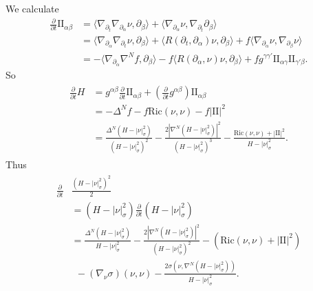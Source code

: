 \documentclass[11pt, letterpaper]{amsart}
\theoremstyle{definition}
\theoremstyle{remark}
\begin{document}
\begin{appendix}
We calculate
\begin{align*}
		\frac{\partial }{\partial t} \mathrm{II}_{\alpha \beta }&= \langle \nabla _{\partial _t} \nabla _{\partial _\alpha }\nu , \partial _{\beta } \rangle + \langle \nabla _{\partial _\alpha }\nu , \nabla _{\partial _t} \partial _{\beta } \rangle \\
							 &= \langle \nabla _{\partial _\alpha } \nabla _{\partial _t} \nu , \partial _{\beta } \rangle+ \langle  R(\partial _t, \partial _{\alpha }) \nu, \partial _{\beta } \rangle + f \langle \nabla _{\partial _\alpha }\nu , \nabla _{\partial _\beta }\nu  \rangle\\
							 &= - \langle \nabla _{\partial _\alpha } \nabla ^{N} f, \partial _{\beta } \rangle - f \langle R( \partial _{\alpha }, \nu )\nu , \partial _{\beta } \rangle+ f g ^{\gamma \gamma '} \mathrm{II}_{\alpha \gamma } \mathrm{II}_{\gamma ' \beta }.
	\end{align*} 
	So
	\begin{align}
		\begin{split}
			\frac{\partial }{\partial t} H &= g^{\alpha \beta } \frac{\partial }{\partial t} \mathrm{II}_{\alpha \beta } + (\frac{\partial }{\partial t} g^{\alpha \beta } )\mathrm{II}_{\alpha \beta } \\
				&= - \Delta ^{N} f - f\mathrm{Ric}(\nu , \nu ) - f |\mathrm{II}|^2 \\
				&= \frac{\Delta ^{N} (H-|\nu |^2_\sigma )}{(H-|\nu |^2_\sigma )^2}- \frac{2|\nabla ^{N}(H-|\nu |^2_\sigma )|^2}{(H- |\nu |^2_\sigma )^3} - \frac{\mathrm{Ric}(\nu ,\nu ) + |\mathrm{II}|^2}{H-|\nu |^2_\sigma }.
		\end{split}
	\end{align} 
	Thus
\begin{align}
	\begin{split}
		\frac{\partial }{\partial t}&\frac{(H - |\nu |^2_{\sigma })^2}{2} \\
		&= (H-|\nu |^2_\sigma ) \frac{\partial }{\partial t}(H-|\nu |^2_\sigma )\\
				&= \frac{\Delta ^{N} (H- |\nu |^2_{\sigma })}{H- |\nu |^2_{\sigma }} - \frac{2|\nabla ^{N}(H-|\nu |^2_{\sigma })|^2}{(H- |\nu |^2_{\sigma })^2} - \left( \mathrm{Ric}(\nu ,\nu ) + |\mathrm{II}|^2 \right)\\
				&\ \ - (\nabla _{\nu }\sigma )(\nu ,\nu ) - \frac{2\sigma (  \nu , \nabla ^{N}(H-|\nu |^2_{\sigma }) )}{H-|\nu |^2_{\sigma }}.
	\end{split}
\end{align} 


\end{appendix}
\end{document}
